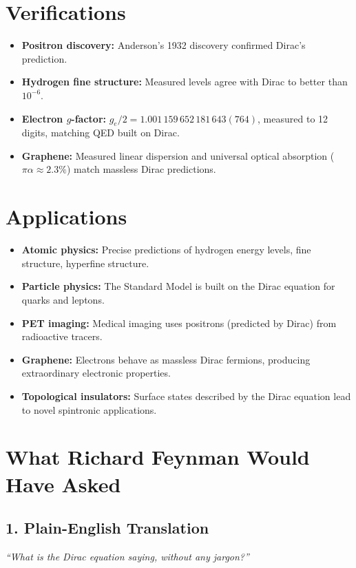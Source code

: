 \section*{Verifications}

\begin{itemize}
\item \textbf{Positron discovery:} Anderson's 1932 discovery confirmed Dirac's prediction.
\item \textbf{Hydrogen fine structure:} Measured levels agree with Dirac to better than $10^{-6}$.
\item \textbf{Electron $g$-factor:} $g_e/2 = 1.001\,159\,652\,181\,643(764)$, measured to 12 digits, matching QED built on Dirac.
\item \textbf{Graphene:} Measured linear dispersion and universal optical absorption ($\pi\alpha \approx 2.3\%$) match massless Dirac predictions.
\end{itemize}
\section*{Applications}

\begin{itemize}
\item \textbf{Atomic physics:} Precise predictions of hydrogen energy levels, fine structure, hyperfine structure.
\item \textbf{Particle physics:} The Standard Model is built on the Dirac equation for quarks and leptons.
\item \textbf{PET imaging:} Medical imaging uses positrons (predicted by Dirac) from radioactive tracers.
\item \textbf{Graphene:} Electrons behave as massless Dirac fermions, producing extraordinary electronic properties.
\item \textbf{Topological insulators:} Surface states described by the Dirac equation lead to novel spintronic applications.
\end{itemize}
\section*{What Richard Feynman Would Have Asked}

\subsection*{1. Plain-English Translation}
\textit{``What is the Dirac equation saying, without any jargon?''}


